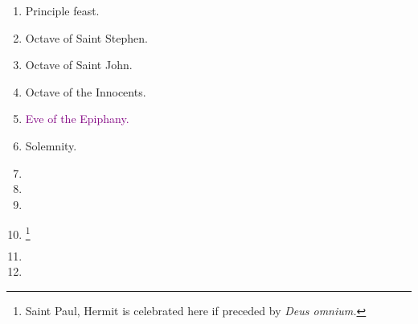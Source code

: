 		\begin{enumerate}
			\item {} Principle feast.
			\item Octave of Saint Stephen. 
			\item Octave of Saint John. 
			\item Octave of the Innocents. 
			\item \textcolor{purple}{Eve of the Epiphany.} 
			\item {} Solemnity.
			\item %
			\item %
			\item %
			\item \footnote{Saint Paul, Hermit is celebrated here if preceded by \textit{Deus omnium.}}
			\item %
			\item %
		\end{enumerate}